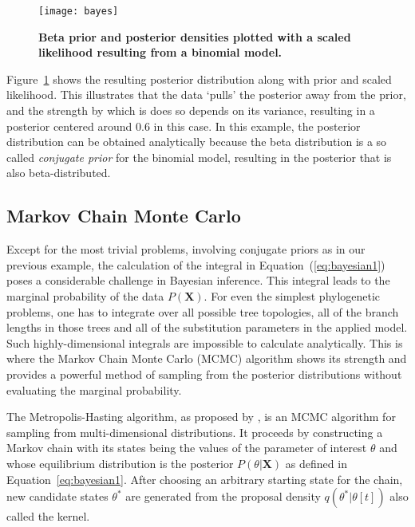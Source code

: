 \begin{figure}[H]
\centering
\texttt{[image: bayes]} 
\caption{
{ \footnotesize 
{\bf Beta prior and posterior densities plotted with a scaled likelihood resulting from a binomial model.} 
}%
}
\label{fig:bayes1}
\end{figure}

Figure~\ref{fig:bayes1} shows the resulting posterior distribution along with prior and scaled likelihood.
This illustrates that the data `pulls' the posterior away from the prior, and the strength by which is does so depends on its variance, resulting in a posterior centered around 0.6 in this case.
In this example, the posterior distribution can be obtained analytically because the beta distribution is a so called \emph{conjugate prior} for the binomial model, resulting in the posterior that is also beta-distributed.

\subsection{Markov Chain Monte Carlo\label{sub:mcmc} }

Except for the most trivial problems, involving conjugate priors as in our previous example, the calculation of the integral in Equation~(\ref{eq:bayesian1}) poses a considerable challenge in Bayesian inference.
This integral leads to the marginal probability of the data $P\left(\mathbf{X}\right)$. 
For even the simplest phylogenetic problems, one has to integrate over all possible tree topologies, all of the branch lengths in those trees and all of the substitution parameters in the applied model.
Such highly-dimensional integrals are impossible to calculate analytically.
This is where the Markov Chain Monte Carlo (MCMC) algorithm shows its strength and provides a powerful method of sampling from the posterior distributions without evaluating the marginal probability. %

The Metropolis-Hasting algorithm, as proposed by \citet{Metropolis1953}, is an MCMC algorithm for sampling from multi-dimensional distributions.
It proceeds by constructing a Markov chain with its states being the values of the parameter of interest $\theta$ and whose equilibrium distribution is the posterior $P\left(\theta|\mathbf{X}\right)$ as defined in Equation~\ref{eq:bayesian1}.
After choosing an arbitrary starting state for the chain, new candidate states $\theta^{*}$ are generated from the proposal density $q(\theta^{*} | \theta[t])$ also called the kernel.

